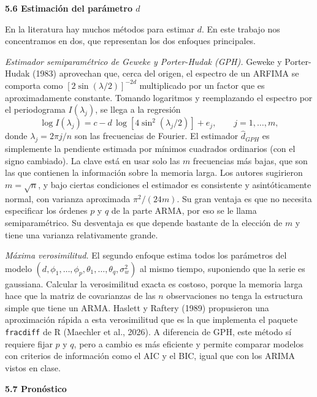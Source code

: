 \documentclass[legalpaper,11pt]{article}
\begin{document}
\begin{enumerate}
\medskip
\noindent\textbf{5.6 Estimaci\'on del par\'ametro $d$}

En la literatura hay muchos m\'etodos para estimar $d$. En este trabajo nos concentramos en dos, que representan los dos enfoques principales.

\emph{Estimador semiparam\'etrico de Geweke y Porter-Hudak (GPH).} Geweke y Porter-Hudak (1983) aprovechan que, cerca del origen, el espectro de un ARFIMA se comporta como $[2\sin(\lambda/2)]^{-2d}$ multiplicado por un factor que es aproximadamente constante. Tomando logaritmos y reemplazando el espectro por el periodograma $I(\lambda_j)$, se llega a la regresi\'on
\begin{equation}
\log I(\lambda_j) = c - d\, \log\!\left[ 4\sin^{2}(\lambda_j/2) \right] + e_j, \qquad j = 1, \ldots, m,
\end{equation}
donde $\lambda_j = 2\pi j/n$ son las frecuencias de Fourier. El estimador $\hat{d}_{GPH}$ es simplemente la pendiente estimada por m\'inimos cuadrados ordinarios (con el signo cambiado). La clave est\'a en usar solo las $m$ frecuencias m\'as bajas, que son las que contienen la informaci\'on sobre la memoria larga. Los autores sugirieron $m = \sqrt{n}$, y bajo ciertas condiciones el estimador es consistente y asint\'oticamente normal, con varianza aproximada $\pi^{2}/(24m)$. Su gran ventaja es que no necesita especificar los \'ordenes $p$ y $q$ de la parte ARMA, por eso se le llama semiparam\'etrico. Su desventaja es que depende bastante de la elecci\'on de $m$ y tiene una varianza relativamente grande.

\emph{M\'axima verosimilitud.} El segundo enfoque estima todos los par\'ametros del modelo $(d, \phi_1, \ldots, \phi_p, \theta_1, \ldots, \theta_q, \sigma_w^{2})$ al mismo tiempo, suponiendo que la serie es gaussiana. Calcular la verosimilitud exacta es costoso, porque la memoria larga hace que la matriz de covarianzas de las $n$ observaciones no tenga la estructura simple que tiene un ARMA. Haslett y Raftery (1989) propusieron una aproximaci\'on r\'apida a esta verosimilitud que es la que implementa el paquete \texttt{fracdiff} de R (Maechler et al., 2026). A diferencia de GPH, este m\'etodo s\'i requiere fijar $p$ y $q$, pero a cambio es m\'as eficiente y permite comparar modelos con criterios de informaci\'on como el AIC y el BIC, igual que con los ARIMA vistos en clase.

\medskip
\noindent\textbf{5.7 Pron\'ostico}


\end{enumerate}
\end{document}
